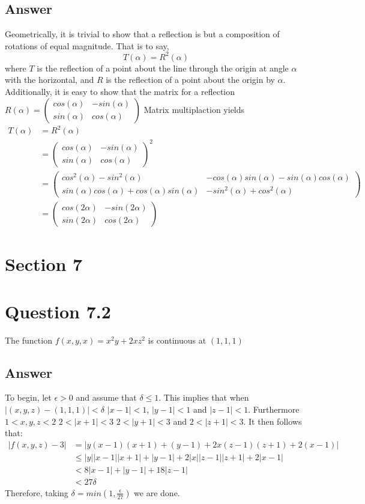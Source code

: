 \documentclass[
	12pt, %
]{fphw}
\begin{document}
\subsection*{Answer}
Geometrically, it is trivial to show that a reflection is but a composition of rotations of equal magnitude. That is to say, $$ T(\alpha)=R^2(\alpha)$$ where $T$ is the reflection of a point about the line through the origin at angle $\alpha$ with the horizontal, and $R$ is the reflection of a point about the origin by $\alpha$. Additionally, it is easy to show that the matrix for a reflection $R(\alpha)=\begin{pmatrix} cos(\alpha) & -sin(\alpha)\\ sin(\alpha) & cos(\alpha) \end{pmatrix}$ 
Matrix multiplaction yields 
\begin{align}
	T(\alpha)&=R^2(\alpha) \\
	&=\begin{pmatrix} cos(\alpha) & -sin(\alpha)\\ sin(\alpha) & cos(\alpha) \end{pmatrix}^2 \\
		&=\begin{pmatrix} cos^2(\alpha)-sin^2(\alpha) & -cos(\alpha)sin(\alpha)-sin(\alpha)cos(\alpha)\\ sin(\alpha)cos(\alpha)+cos(\alpha)sin(\alpha) & -sin^2(\alpha)+cos^2(\alpha) \end{pmatrix} \\
		&=\begin{pmatrix} cos(2\alpha) & -sin(2\alpha)\\ sin(2\alpha) & cos(2\alpha) \end{pmatrix}
\end{align}
\section*{Section 7}
\section*{Question 7.2}
\begin{problem}
	The function $f(x,y,x)= x^2y+2xz^2$ is continuous at $(1,1,1)$ 
\end{problem}
\subsection*{Answer}
To begin, let $\epsilon>0$ and assume that $\delta \leq 1$. This implies that when $|(x,y,z)-(1,1,1)|< \delta$
$|x-1|<1$, $|y-1|<1$ and $|z-1|<1$. Furthermore $1<x,y,z<2$ $2<|x+1|<3$ $2<|y+1|<3$ and $2<|z+1|<3$. It then follows that:
\begin{align}
	|f(x,y,z)-3|&=|y(x-1)(x+1)+(y-1)+2x(z-1)(z+1)+2(x-1)| \\
	&\leq |y||x-1||x+1|+|y-1|+2|x||z-1||z+1|+2|x-1| \\ 
	&< 8|x-1|+|y-1|+18|z-1| \\
	&< 27\delta
\end{align}
Therefore, taking $\delta=min(1,\frac{\epsilon}{27})$ we are done.
\end{document}

